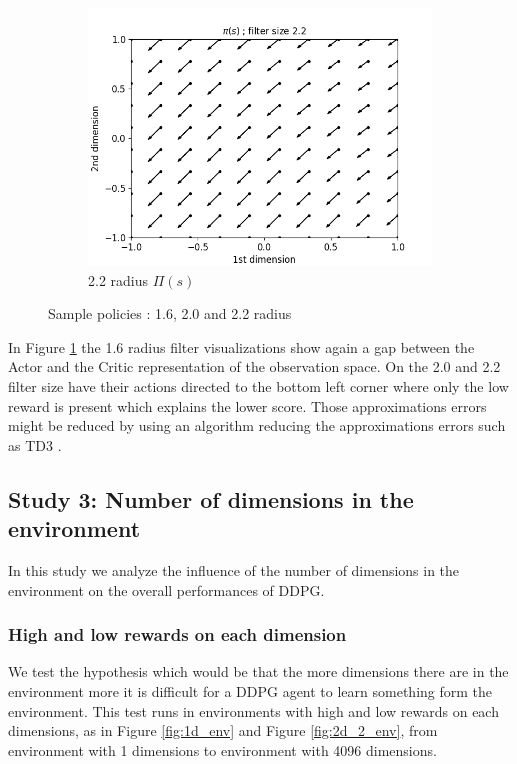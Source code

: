 \documentclass{article}
\begin{document}
\begin{figure}[H]
\begin{subfigure}[b]{0.3\linewidth}
    \includegraphics[width=\linewidth]{Study_2/2.4/visualizations/Pi_arrow_2_2.png}
      \caption{2.2 radius $\Pi(s)$}
  \end{subfigure}
  \caption{Sample policies : 1.6, 2.0 and 2.2 radius}
  \label{fig:sample_policies_corner_sequential}
  \end{figure}
 
 In Figure \ref{fig:sample_policies_corner_sequential} the 1.6 radius filter visualizations show again a gap between the Actor and the Critic representation of the observation space. On the 2.0 and 2.2 filter size have their actions directed to the bottom left corner where only the low reward is present which explains the lower score. Those approximations errors might be reduced by using an algorithm reducing the approximations errors such as TD3 \cite{fujimoto_addressing_2018}.
 
\subsection{Study 3: Number of dimensions in the environment}

In this study we analyze the influence of the number of dimensions in the environment on the overall performances of DDPG.

\subsubsection{High and low rewards on each dimension}

We test the hypothesis which would be that the more dimensions there are in the environment more it is difficult for a DDPG agent to learn something form the environment. This test runs in environments with high and low rewards on each dimensions, as in Figure \ref{fig:1d_env} and Figure \ref{fig:2d_2_env}, from environment with 1 dimensions to environment with 4096 dimensions.
\end{document}
